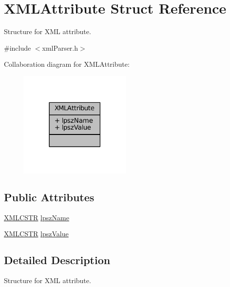 \hypertarget{structXMLAttribute}{\section{X\-M\-L\-Attribute Struct Reference}
\label{structXMLAttribute}
}


Structure for X\-M\-L attribute.  




{\ttfamily \#include $<$xml\-Parser.\-h$>$}



Collaboration diagram for X\-M\-L\-Attribute\-:
\nopagebreak
\begin{figure}[H]
\begin{center}
\leavevmode
\includegraphics[width=158pt]{structXMLAttribute__coll__graph}
\end{center}
\end{figure}
\subsection*{Public Attributes}
\begin{DoxyCompactItemize}
\item 
\hyperlink{xmlParser_8h_acdb0d6fd8dd596384b438d86cfb2b182}{X\-M\-L\-C\-S\-T\-R} \hyperlink{structXMLAttribute_a59d24e06998261f56a5b8e2f2b20ea9e}{lpsz\-Name}
\item 
\hyperlink{xmlParser_8h_acdb0d6fd8dd596384b438d86cfb2b182}{X\-M\-L\-C\-S\-T\-R} \hyperlink{structXMLAttribute_a2e1317aefc63d17247e3e12091b90618}{lpsz\-Value}
\end{DoxyCompactItemize}


\subsection{Detailed Description}
Structure for X\-M\-L attribute. 

